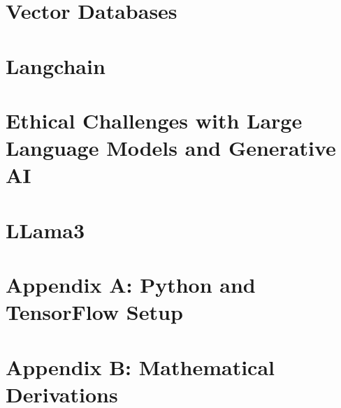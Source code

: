 \documentclass[12pt]{book}
\begin{document}
\chapter{Vector Databases}


\chapter{Langchain}


\chapter{Ethical Challenges with Large Language Models and Generative AI}


\chapter{LLama3}



\appendix
\chapter{Appendix A: Python and TensorFlow Setup}


\chapter{Appendix B: Mathematical Derivations}


\backmatter
% 
\printindex
\end{document}
